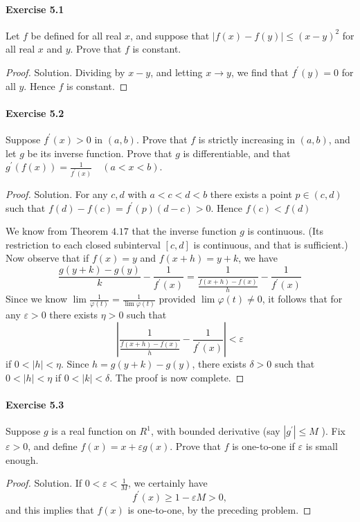 \documentclass{article}
\theoremstyle{definition}
\begin{document}
\paragraph{Exercise 5.1} Let $f$ be defined for all real $x$, and suppose that $|f(x)-f(y)| \leq (x-y)^{2}$ for all real $x$ and $y$. Prove that $f$ is constant.
\begin{proof}
    Solution. Dividing by $x-y$, and letting $x \rightarrow y$, we find that $f^{\prime}(y)=0$ for all $y$. Hence $f$ is constant.
\end{proof}


\paragraph{Exercise 5.2} Suppose $f^{\prime}(x)>0$ in $(a, b)$. Prove that $f$ is strictly increasing in $(a, b)$, and let $g$ be its inverse function. Prove that $g$ is differentiable, and that $g^{\prime}(f(x))=\frac{1}{f^{\prime}(x)} \quad(a<x<b)$.
\begin{proof}
   Solution. For any $c, d$ with $a<c<d<b$ there exists a point $p \in(c, d)$ such that $f(d)-f(c)=f^{\prime}(p)(d-c)>0$. Hence $f(c)<f(d)$

We know from Theorem $4.17$ that the inverse function $g$ is continuous. (Its restriction to each closed subinterval $[c, d]$ is continuous, and that is sufficient.) Now observe that if $f(x)=y$ and $f(x+h)=y+k$, we have
$$
\frac{g(y+k)-g(y)}{k}-\frac{1}{f^{\prime}(x)}=\frac{1}{\frac{f(x+h)-f(x)}{h}}-\frac{1}{f^{\prime}(x)}
$$
Since we know $\lim \frac{1}{\varphi(t)}=\frac{1}{\lim \varphi(t)}$ provided $\lim \varphi(t) \neq 0$, it follows that for any $\varepsilon>0$ there exists $\eta>0$ such that
$$
\left|\frac{1}{\frac{f(x+h)-f(x)}{h}}-\frac{1}{f^{\prime}(x)}\right|<\varepsilon
$$
if $0<|h|<\eta$. Since $h=g(y+k)-g(y)$, there exists $\delta>0$ such that $0<|h|<\eta$ if $0<|k|<\delta$. The proof is now complete. 
\end{proof}


\paragraph{Exercise 5.3} Suppose $g$ is a real function on $R^{1}$, with bounded derivative (say $\left|g^{\prime}\right| \leq M$ ). Fix $\varepsilon>0$, and define $f(x)=x+\varepsilon g(x)$. Prove that $f$ is one-to-one if $\varepsilon$ is small enough.
\begin{proof}
    Solution. If $0<\varepsilon<\frac{1}{M}$, we certainly have
$$
f^{\prime}(x) \geq 1-\varepsilon M>0,
$$
and this implies that $f(x)$ is one-to-one, by the preceding problem.
\end{proof}
\end{document}
